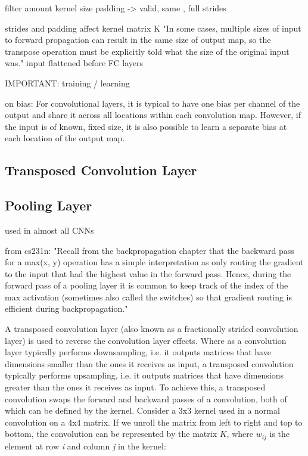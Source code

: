 filter amount
kernel size
padding -> valid, same , full
strides

strides and padding affect kernel matrix K
"In some cases, multiple sizes of input to forward propagation can
result in the same size of output map, so the transpose operation must be explicitly
told what the size of the original input was."
input flattened before FC layers

IMPORTANT: training / learning

on bias:
For convolutional
layers, it is typical to have one bias per channel of the output and share it across
all locations within each convolution map. However, if the input is of known, fixed
size, it is also possible to learn a separate bias at each location of the output map.


\subsection{Transposed Convolution Layer}


\subsection{Pooling Layer}

used in almost all CNNs

from cs231n:
"Recall from the backpropagation chapter that the backward pass for a max(x, y) operation has a simple interpretation as only routing the gradient to the input that had the highest value in the forward pass. Hence, during the forward pass of a pooling layer it is common to keep track of the index of the max activation (sometimes also called the switches) so that gradient routing is efficient during backpropagation."


\noindent A transposed convolution layer (also known as a fractionally strided convolution layer) is used to reverse the convolution layer effects. Where as a convolution layer typically performs downsampling, i.e. it outputs matrices that have dimensions smaller than the ones it receives as input, a transposed convolution typically performs upsampling, i.e. it outputs matrices that have dimensions greater than the ones it receives as input. To achieve this, a transposed convolution swaps the forward and backward passes of a convolution, both of which can be defined by the kernel. Consider a 3x3 kernel used in a normal convolution on a 4x4 matrix. If we unroll the matrix from left to right and top to bottom, the convolution can be represented by the matrix $K$, where \textit{$w_{ij}$} is the element at row \textit{i} and column \textit{j} in the kernel:

